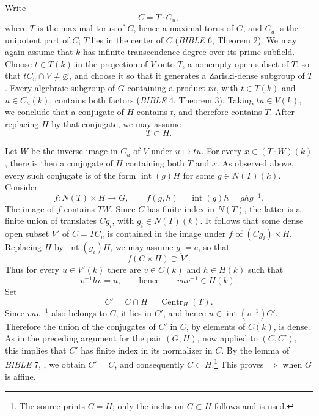 Write
\[
  C=T\cdot C_u,
\]
where \(T\) is the maximal torus of \(C\), hence a maximal torus of
\(G\), and \(C_u\) is the unipotent part of \(C\); \(T\) lies in the
center of \(C\) (\emph{BIBLE} 6, Theorem 2). We may again assume that
\(k\) has infinite transcendence degree over its prime subfield.
Choose \(t\in T(k)\) in the projection of \(V\) onto \(T\), a
nonempty open subset of \(T\), so that
\(tC_u\cap V\neq\varnothing\), and choose it so that it generates a
Zariski-dense subgroup of \(T\). Every algebraic subgroup of \(G\)
containing a product \(tu\), with \(t\in T(k)\) and
\(u\in C_u(k)\), contains both factors (\emph{BIBLE} 4,
Theorem 3). Taking \(tu\in V(k)\), we conclude that a conjugate of
\(H\) contains \(t\), and therefore contains \(T\). After replacing
\(H\) by that conjugate, we may assume
\[
  T\subset H.
\]

Let \(W\) be the inverse image in \(C_u\) of \(V\) under
\(u\mapsto tu\). For every \(x\in(T\cdot W)(k)\), there is then a conjugate
of \(H\) containing both \(T\) and \(x\). As observed above, every
such conjugate is of the form \(\operatorname{int}(g)H\) for some
\(g\in N(T)(k)\). Consider
\[
  f:N(T)\times H\longrightarrow G,\qquad
  f(g,h)=\operatorname{int}(g)h=ghg^{-1}.
\]
The image of \(f\) contains \(TW\). Since \(C\) has finite index in
\(N(T)\), the latter is a finite union of translates \(Cg_i\), with
\(g_i\in N(T)(k)\). It follows that some dense open subset \(V'\) of
\(C=T C_u\) is contained in the image under \(f\) of
\((Cg_i)\times H\). Replacing \(H\) by
\(\operatorname{int}(g_i)H\), we may assume \(g_i=e\), so that
\[
  f(C\times H)\supset V'.
\]
Thus for every \(u\in V'(k)\) there are \(v\in C(k)\) and
\(h\in H(k)\) such that
\[
  v^{-1}hv=u,\qquad\text{hence}\qquad vuv^{-1}\in H(k).
\]
Set
\[
  C'=C\cap H=\operatorname{Centr}_H(T).
\]
Since \(vuv^{-1}\) also belongs to \(C\), it lies in \(C'\), and
hence \(u\in\operatorname{int}(v^{-1})C'\). Therefore the union of
the conjugates of \(C'\) in \(C\), by elements of \(C(k)\), is
dense. As in the preceding argument for the pair \((G,H)\), now
applied to \((C,C')\), this implies that \(C'\) has finite index in
its normalizer in \(C\). By the lemma of \emph{BIBLE} 7, ,
we obtain \(C'=C\), and consequently \(C\subset H\).\footnote{The
source prints \(C=H\); only the inclusion \(C\subset H\) follows and
is used.} This proves
 \(\Rightarrow\)  when \(G\) is affine.

